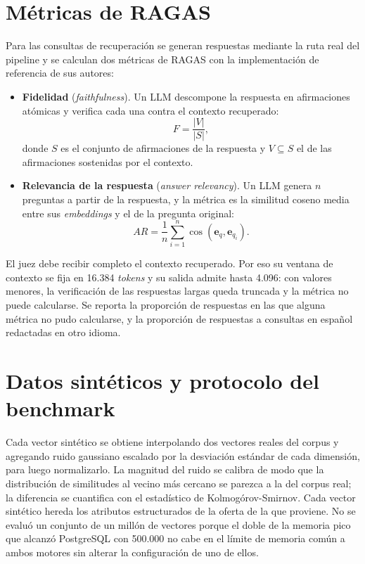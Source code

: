 \section{Métricas de RAGAS}
\label{anx:ragas}

Para las consultas de recuperación se generan respuestas mediante la ruta real del pipeline y se calculan dos métricas de RAGAS \citep{Es2024} con la implementación de referencia de sus autores:
\begin{itemize}
    \item \textbf{Fidelidad} (\textit{faithfulness}). Un LLM descompone la respuesta en afirmaciones atómicas y verifica cada una contra el contexto recuperado:
    \[
    F = \frac{|V|}{|S|},
    \]
    donde $S$ es el conjunto de afirmaciones de la respuesta y $V \subseteq S$ el de las afirmaciones sostenidas por el contexto.
    \item \textbf{Relevancia de la respuesta} (\textit{answer relevancy}). Un LLM genera $n$ preguntas a partir de la respuesta, y la métrica es la similitud coseno media entre sus \textit{embeddings} y el de la pregunta original:
    \[
    AR = \frac{1}{n}\sum_{i=1}^{n} \cos(\mathbf{e}_q, \mathbf{e}_{q_i}).
    \]
\end{itemize}
El juez debe recibir completo el contexto recuperado. Por eso su ventana de contexto se fija en 16.384 \textit{tokens} y su salida admite hasta 4.096: con valores menores, la verificación de las respuestas largas queda truncada y la métrica no puede calcularse. Se reporta la proporción de respuestas en las que alguna métrica no pudo calcularse, y la proporción de respuestas a consultas en español redactadas en otro idioma.

\section{Datos sintéticos y protocolo del benchmark}
\label{anx:sinteticos}

Cada vector sintético se obtiene interpolando dos vectores reales del corpus y agregando ruido gaussiano escalado por la desviación estándar de cada dimensión, para luego normalizarlo. La magnitud del ruido se calibra de modo que la distribución de similitudes al vecino más cercano se parezca a la del corpus real; la diferencia se cuantifica con el estadístico de Kolmogórov-Smirnov. Cada vector sintético hereda los atributos estructurados de la oferta de la que proviene. No se evaluó un conjunto de un millón de vectores porque el doble de la memoria pico que alcanzó PostgreSQL con 500.000 no cabe en el límite de memoria común a ambos motores sin alterar la configuración de uno de ellos.

